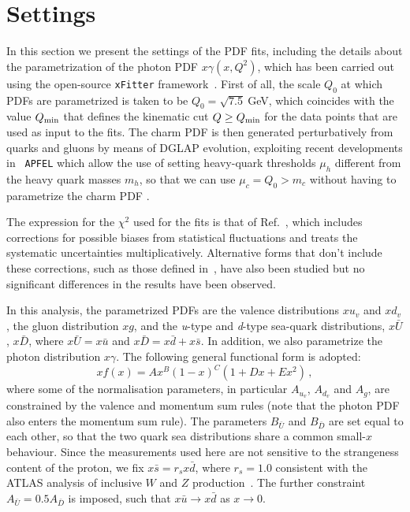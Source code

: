 \section{Settings}
\label{sec:fitsettings}

In this section we present the settings of the PDF fits, including the details about the
parametrization of the photon PDF $x\gamma(x,Q^2)$, which has been
carried out using the open-source {\tt xFitter}
framework~\cite{Alekhin:2014irh}.
%
First of all, the scale $Q_0$ at which PDFs are parametrized is taken to be
$Q_0 = \sqrt{7.5}~$GeV, which coincides with the value $Q_{\rm min}$ that defines
the kinematic cut $Q \ge Q_{\rm min}$ for the
data points that are used as input to the fits.
%
The charm PDF is then generated perturbatively from quarks and gluons by
means of DGLAP evolution, exploiting recent developments in {\tt
  APFEL} which allow the use of setting heavy-quark thresholds $\mu_h$
different from the heavy quark masses $m_h$, so that we can use
$\mu_c=Q_0 > m_c$ without having to parametrize the charm PDF \cite{current:work}.

The expression for the $\chi^2$ used for the fits is that
of Ref.~\cite{Aaron:2012qi}, which
includes corrections for possible 
biases from statistical fluctuations and treats the systematic uncertainties
multiplicatively.
%
Alternative forms that don't include these corrections, such as those
defined in~\cite{Aaron:2009aa,Abramowicz:2015mha},
have also been studied but no significant differences
in the results have been observed.
%

In this analysis, the parametrized PDFs are the valence distributions
$xu_{v}$ and $xd_{v}$, the gluon distribution $xg$, and the
\textit{u}-type and \textit{d}-type sea-quark distributions,
$x\bar{U}$, $x\bar{D}$, where $x\bar{U} = x\bar{u}$ and
$x\bar{D} = x\bar{d} + x\bar{s}$.
%
In addition, we also parametrize the photon distribution $x\gamma$.
%
The following general functional form is adopted:
\begin{equation}
  \label{eq:parametrization}
xf(x) = Ax^{B}(1-x)^{C}(1+Dx+Ex^{2}) \, ,
\end{equation}
where some of the normalisation parameters, in particular $A_{u_{v}}$,
$A_{d_{v}}$ and $A_{g}$, are constrained by the valence and momentum
sum rules (note that the photon PDF also enters the momentum sum rule).
%
The parameters $B_{\bar{U}}$ and $B_{\bar{D}}$ are set equal to each
other, so that the two quark sea distributions share a common
small-$x$ behaviour.
%
Since the measurements used here are not sensitive to the strangeness
content of the proton, we fix $x\bar{s} = r_sx\bar{d}$, where
$r_s=1.0$ consistent with the ATLAS analysis of inclusive $W$
and $Z$ production~\cite{Aad:2012sb,Aaboud:2016btc}.
%
The further constraint $A_{\bar{U}} = 0.5 A_{\bar{D}}$ is imposed,
such that $x\bar{u} \to x\bar{d}$ as $x \to 0$.  

